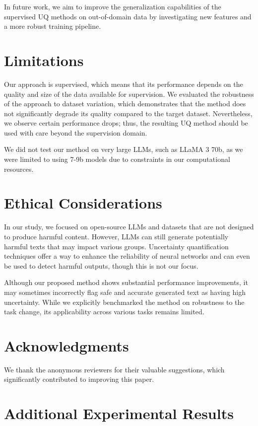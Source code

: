\documentclass[11pt]{article}
\begin{document}
  In future work, we aim to improve the generalization capabilities of the supervised UQ methods on out-of-domain data by investigating new features and a more robust training pipeline.

\section*{Limitations}
  Our approach is supervised, which means that its performance depends on the quality and size of the data available for supervision. We evaluated the robustness of the approach to dataset variation, which demonstrates that the method does not significantly degrade its quality compared to the target dataset. Nevertheless, we observe certain performance drops; thus, the resulting UQ method should be used with care beyond the supervision domain.

  We did not test our method on very large LLMs, such as LLaMA 3 70b, as we were limited to using 7-9b models due to constraints in our computational resources.

\section*{Ethical Considerations}
  In our study, we focused on open-source LLMs and datasets that are not designed to produce harmful content. However, LLMs can still generate potentially harmful texts that may impact various groups. Uncertainty quantification techniques offer a way to enhance the reliability of neural networks and can even be used to detect harmful outputs, though this is not our focus.

  Although our proposed method shows substantial performance improvements, it may sometimes incorrectly flag safe and accurate generated text as having high uncertainty. While we explicitly benchmarked the method on robustness to the task change, its applicability across various tasks remains limited.

\section*{Acknowledgments}
We thank the anonymous reviewers for their valuable suggestions, which significantly contributed to improving this paper.



\appendix
\onecolumn

\section{Additional Experimental Results}
\label{sec:experiments}
\end{document}
